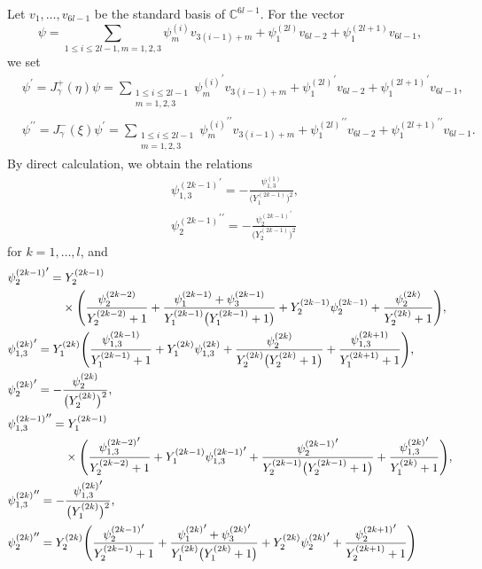 \documentclass[10pt,a4paper]{amsart}
\numberwithin{equation}{section}
\newcommand{\C}{{\mathbb C}}
\begin{document}
Let $v_1,\dots,v_{6l-1}$ be the standard basis of $\C^{6l-1}$.
For the vector
	\[\psi=\sum_{1\leq i\leq 2l-1,m=1,2,3}\psi_m^{(i)}v_{3(i-1)+m}+\psi_1^{(2l)}v_{6l-2}+\psi_1^{(2l+1)}v_{6l-1},\]
we set
	\begin{align*}
	&\psi^\prime=J_\gamma^+(\eta)\psi=\sum_{\substack{1\leq i\leq 2l-1\\ m=1,2,3}}{\psi_m^{(i)}}^\prime v_{3(i-1)+m}+{\psi_1^{(2l)}}^\prime v_{6l-2}+{\psi_1^{(2l+1)}}^\prime v_{6l-1},\\
	&\psi^{\prime\prime}=J_\gamma^-(\xi)\psi^\prime=\sum_{\substack{1\leq i\leq 2l-1\\ m=1,2,3}}{\psi_m^{(i)}}^{\prime\prime} v_{3(i-1)+m}+{\psi_1^{(2l)}}^{\prime\prime} v_{6l-2}+{\psi_1^{(2l+1)}}^{\prime\prime} v_{6l-1}.
	\end{align*}
	By direct calculation, we obtain the relations
		\begin{align}
		\label{Cr1}&{\psi_{1,3}^{(2k-1)}}^\prime=-\frac{\psi_{1,3}^{(1)}}{\bigl(Y_1^{(2k-1)}\bigr)^2},\\
		\label{Crp2}&{\psi_2^{(2k-1)}}^{\prime\prime}=-\frac{{\psi_2^{(2k-1)}}^\prime}{\bigl(Y_2^{(2k-1)}\bigr)^2}
		\end{align}
	for $k=1,\dots,l$, and
		\begin{align} \label{Cr2}&{\psi_2^{(2k-1)}}^\prime=Y_2^{(2k-1)}\\
\nonumber&\hphantom{{\psi_2^{(2k-1)}}^\prime=}{}\times
\Biggl(\frac{\psi_2^{(2k-2)}}{Y_2^{(2k-2)}+1}+\frac{\psi_1^{(2k-1)}+\psi_3^{(2k-1)}}{Y_1^{(2k-1)}\bigl(Y_1^{(2k-1)}+1\bigr)} +Y_2^{(2k-1)}\psi_2^{(2k-1)}+\frac{\psi_2^{(2k)}}{Y_2^{(2k)}+1}\Biggr),\\
		\label{Cr3}&{\psi_{1,3}^{(2k)}}^\prime=Y_1^{(2k)}\Biggl(\frac{\psi_{1,3}^{(2k-1)}}{Y_1^{(2k-1)}+1}+Y_1^{(2k)}\psi_{1,3}^{(2k)}+\frac{\psi_2^{(2k)}}{Y_2^{(2k)}\bigl(Y_2^{(2k)}+1\bigr)} +\frac{\psi_{1,3}^{(2k+1)}}{Y_1^{(2k+1)}+1}\Biggr),\\
		\label{Cr4}&{\psi_2^{(2k)}}^\prime=-\frac{\psi_2^{(2k)}}{\bigl(Y_2^{(2k)}\bigr)^2},\\
		\label{Crp1}&{\psi_{1,3}^{(2k-1)}}^{\prime\prime}=Y_1^{(2k-1)}\\
\nonumber&\hphantom{{\psi_{1,3}^{(2k-1)}}^{\prime\prime}=}{}\times
\Biggl(\frac{{\psi_{1,3}^{(2k-2)}}^\prime}{Y_2^{(2k-2)}+1}+Y_1^{(2k-1)}{\psi_{1,3}^{(2k-1)}}^\prime +\frac{{\psi_2^{(2k-1)}}^\prime}{Y_2^{(2k-1)}\bigl(Y_2^{(2k-1)}+1\bigr)}+\frac{{\psi_{1,3}^{(2k)}}^\prime}{Y_1^{(2k)}+1}\Biggr),\\
		\label{Crp3}&{\psi_{1,3}^{(2k)}}^{\prime\prime}=-\frac{{\psi_{1,3}^{(2k)}}^\prime}{\bigl(Y_1^{(2k)}\bigr)^2},\\
		\label{Crp4}&{\psi_2^{(2k)}}^{\prime\prime}=Y_2^{(2k)}\Biggl(\frac{{\psi_2^{(2k-1)}}^\prime}{Y_2^{(2k-1)}+1}+\frac{{\psi_1^{(2k)}}^\prime +{\psi_3^{(2k)}}^\prime}{Y_1^{(2k)}\bigl(Y_1^{(2k)}+1\bigr)}+Y_2^{(2k)}{\psi_2^{(2k)}}^\prime+\frac{{\psi_2^{(2k+1)}}^\prime}{Y_2^{(2k+1)}+1}\Biggr)
		\end{align}
\end{document}
